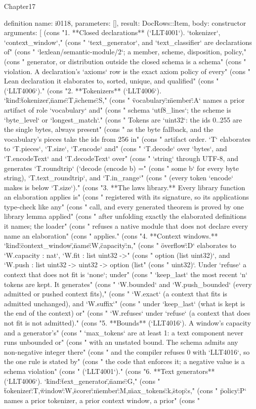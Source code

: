 \begin{lexlean}{Chapter17}
\begin{semanticmodule}
definition{
  name: i0118,
  parameters: [],
  result: DocRows::Item,
  body: constructor{
    arguments: [
      (cons "1. **Closed declarations** (`LLT4001`). `tokenizer`, `context_window`," (cons "   `text_generator`, and `text_classifier` are declarations of" (cons "   `lexlean/semantic-module/2`; a member, scheme, disposition, policy," (cons "   generator, or distribution outside the closed schema is a schema" (cons "   violation. A declaration's `axioms` row is the exact axiom policy of every" (cons "   Lean declaration it elaborates to, sorted, unique, and qualified" (cons "   (`LLT4006`)." (cons "2. **Tokenizers** (`LLT4006`). `{\"kind\":\"tokenizer\",\"name\":T,\"scheme\":S," (cons "   \"vocabulary\":{\"member\":A}}` names a prior artifact of role `vocabulary` and" (cons "   schema `utf8_lines`; the scheme is `byte_level` or `longest_match`." (cons "   Tokens are `uint32`: the ids 0..255 are the single bytes, always present" (cons "   as the byte fallback, and the vocabulary's pieces take the ids from 256 in" (cons "   artifact order. `T` elaborates to `T.pieces`, `T.size`, `T.encode` and" (cons "   `T.decode` over `bytes`, and `T.encodeText` and `T.decodeText` over" (cons "   `string` through UTF-8, and generates `T.roundtrip` (`decode (encode b) =" (cons "   some b` for every byte string), `T.text_roundtrip`, and `T.in_range`" (cons "   (every token `encode` makes is below `T.size`)." (cons "3. **The laws library.** Every library function an elaboration applies is" (cons "   registered with its signature, so its applications type-check like any" (cons "   call, and every generated theorem is proved by one library lemma applied" (cons "   after unfolding exactly the elaborated definitions it names; the loader" (cons "   refuses a native module that does not declare every name an elaboration" (cons "   applies." (cons "4. **Context windows.** `{\"kind\":\"context_window\",\"name\":W,\"capacity\":n," (cons "   \"overflow\":D}` elaborates to `W.capacity : nat`, `W.fit : list uint32 ->" (cons "   option (list uint32)`, and `W.push : list uint32 -> uint32 -> option (list" (cons "   uint32)`. Under `refuse` a context that does not fit is `none`; under" (cons "   `keep_last` the most recent `n` tokens are kept. It generates" (cons "   `W.bounded` and `W.push_bounded` (every admitted or pushed context fits)," (cons "   `W.exact` (a context that fits is admitted unchanged), and `W.suffix`" (cons "   under `keep_last` (what is kept is the end of the context) or" (cons "   `W.refuses` under `refuse` (a context that does not fit is not admitted)." (cons "5. **Bounds** (`LLT4016`). A window's capacity and a generator's" (cons "   `max_tokens` are at least 1: a text component never runs unbounded or" (cons "   with an unstated bound. The schema admits any non-negative integer there" (cons "   and the compiler refuses 0 with `LLT4016`, so the one rule is stated by" (cons "   the code that enforces it; a negative value is a schema violation" (cons "   (`LLT4001`)." (cons "6. **Text generators** (`LLT4006`). `{\"kind\":\"text_generator\",\"name\":G," (cons "   \"tokenizer\":T,\"window\":W,\"scorer\":{\"member\":M},\"max_tokens\":k,\"stop\":s," (cons "   \"policy\":P}` names a prior tokenizer, a prior context window, a prior" (cons " }}
\end{semanticmodule}
\end{lexlean}
